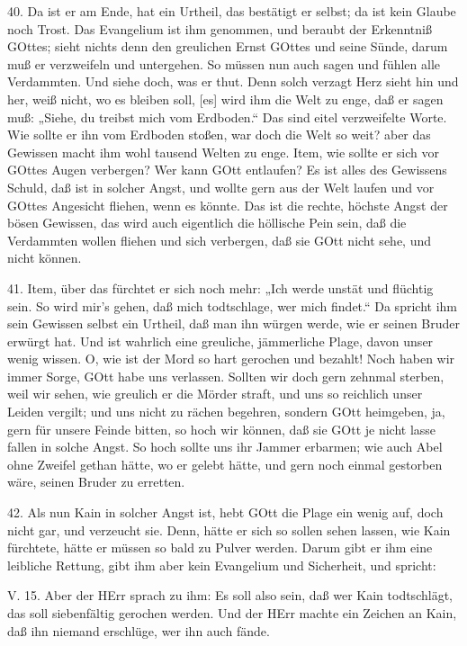 40. Da ist er am Ende, hat ein Urtheil, das bestätigt er selbst; da ist kein Glaube noch Trost. Das Evangelium ist ihm genommen, und beraubt der Erkenntniß GOttes; sieht nichts denn den greulichen Ernst GOttes und seine Sünde, darum muß er verzweifeln und untergehen. So müssen nun auch sagen und fühlen alle Verdammten. Und siehe doch, was er thut. Denn solch verzagt Herz sieht hin und her, weiß nicht, wo es bleiben soll, [es] wird ihm die Welt zu enge, daß er sagen muß: „Siehe, du treibst mich vom Erdboden.“ Das sind eitel verzweifelte Worte. Wie sollte er ihn vom Erdboden stoßen, war doch die Welt so weit? aber das Gewissen macht ihm wohl tausend Welten zu enge. Item, wie sollte er sich vor GOttes Augen verbergen? Wer kann GOtt entlaufen? Es ist alles des Gewissens Schuld, daß ist in solcher Angst, und wollte gern aus der Welt laufen und vor GOttes Angesicht fliehen, wenn es könnte. Das ist die rechte, höchste Angst der bösen Gewissen, das wird auch eigentlich die höllische Pein sein, daß die Verdammten wollen fliehen und sich verbergen, daß sie GOtt nicht sehe, und nicht können.

41. Item, über das fürchtet er sich noch mehr: „Ich werde unstät und flüchtig sein. So wird mir’s gehen, daß mich todtschlage, wer mich findet.“ Da spricht ihm sein Gewissen selbst ein Urtheil, daß man ihn würgen werde, wie er seinen Bruder erwürgt hat. Und ist wahrlich eine greuliche, jämmerliche Plage, davon unser wenig wissen. O, wie ist der Mord so hart gerochen und bezahlt! Noch haben wir immer Sorge, GOtt habe uns verlassen. Sollten wir doch gern zehnmal sterben, weil wir sehen, wie greulich er die Mörder straft, und uns so reichlich unser Leiden vergilt; und uns nicht zu rächen begehren, sondern GOtt heimgeben, ja, gern für unsere Feinde bitten, so hoch wir können, daß sie GOtt je nicht lasse fallen in solche Angst. So hoch sollte uns ihr Jammer erbarmen; wie auch Abel ohne Zweifel gethan hätte, wo er gelebt hätte, und gern noch einmal gestorben wäre, seinen Bruder zu erretten.

42. Als nun Kain in solcher Angst ist, hebt GOtt die Plage ein wenig auf, doch nicht gar, und verzeucht sie. Denn, hätte er sich so sollen sehen lassen, wie Kain fürchtete, hätte er müssen so bald zu Pulver werden. Darum gibt er ihm eine leibliche Rettung, gibt ihm aber kein Evangelium und Sicherheit, und spricht:

\begin{schriftzitat}
V. 15. Aber der HErr sprach zu ihm: Es soll also sein, daß wer Kain todtschlägt, das soll siebenfältig gerochen werden. Und der HErr machte ein Zeichen an Kain, daß ihn niemand erschlüge, wer ihn auch fände.
\end{schriftzitat}

